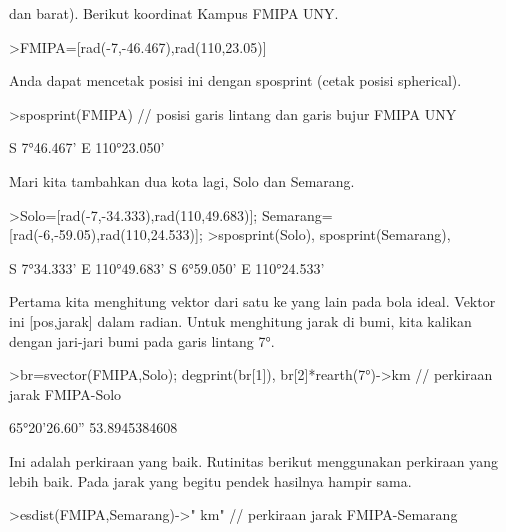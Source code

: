 \documentclass{article}
\begin{document}
\begin{eulernotebook}
\begin{eulercomment}
\begin{eulercomment}
\begin{eulercomment}
\begin{eulercomment}
\begin{eulercomment}
dan barat). Berikut koordinat Kampus FMIPA UNY.
\end{eulercomment}
\begin{eulerprompt}
>FMIPA=[rad(-7,-46.467),rad(110,23.05)]
\end{eulerprompt}
\begin{euleroutput}
  [-0.13569,  1.92657]
\end{euleroutput}
\begin{eulercomment}
Anda dapat mencetak posisi ini dengan sposprint (cetak posisi
spherical).
\end{eulercomment}
\begin{eulerprompt}
>sposprint(FMIPA) // posisi garis lintang dan garis bujur FMIPA UNY
\end{eulerprompt}
\begin{euleroutput}
  S 7°46.467' E 110°23.050'
\end{euleroutput}
\begin{eulercomment}
Mari kita tambahkan dua kota lagi, Solo dan Semarang.
\end{eulercomment}
\begin{eulerprompt}
>Solo=[rad(-7,-34.333),rad(110,49.683)]; Semarang=[rad(-6,-59.05),rad(110,24.533)];
>sposprint(Solo), sposprint(Semarang),
\end{eulerprompt}
\begin{euleroutput}
  S 7°34.333' E 110°49.683'
  S 6°59.050' E 110°24.533'
\end{euleroutput}
\begin{eulercomment}
Pertama kita menghitung vektor dari satu ke yang lain pada bola ideal.
Vektor ini [pos,jarak] dalam radian. Untuk menghitung jarak di bumi,
kita kalikan dengan jari-jari bumi pada garis lintang 7°.
\end{eulercomment}
\begin{eulerprompt}
>br=svector(FMIPA,Solo); degprint(br[1]), br[2]*rearth(7°)->km // perkiraan jarak FMIPA-Solo
\end{eulerprompt}
\begin{euleroutput}
  65°20'26.60''
  53.8945384608
\end{euleroutput}
\begin{eulercomment}
Ini adalah perkiraan yang baik. Rutinitas berikut menggunakan
perkiraan yang lebih baik. Pada jarak yang begitu pendek hasilnya
hampir sama.
\end{eulercomment}
\begin{eulerprompt}
>esdist(FMIPA,Semarang)->" km" // perkiraan jarak FMIPA-Semarang
\end{eulerprompt}

\end{eulercomment}
\end{eulercomment}
\end{eulercomment}
\end{eulercomment}
\end{eulernotebook}
\end{document}
